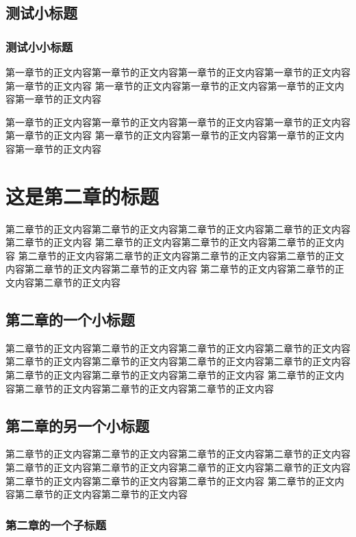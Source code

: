 \documentclass{yacauthesisug}
\begin{document}
\subsection{测试小标题}
\subsubsection{测试小小标题}

第一章节的正文内容第一章节的正文内容第一章节的正文内容第一章节的正文内容第一章节的正文内容
第一章节的正文内容第一章节的正文内容第一章节的正文内容第一章节的正文内容

第一章节的正文内容第一章节的正文内容第一章节的正文内容第一章节的正文内容第一章节的正文内容
第一章节的正文内容第一章节的正文内容第一章节的正文内容第一章节的正文内容

\section{这是第二章的标题}

第二章节的正文内容第二章节的正文内容第二章节的正文内容第二章节的正文内容第二章节的正文内容
第二章节的正文内容第二章节的正文内容第二章节的正文内容
第二章节的正文内容第二章节的正文内容第二章节的正文内容第二章节的正文内容第二章节的正文内容第二章节的正文内容
第二章节的正文内容第二章节的正文内容第二章节的正文内容

\subsection{第二章的一个小标题}

第二章节的正文内容第二章节的正文内容第二章节的正文内容第二章节的正文内容
第二章节的正文内容第二章节的正文内容第二章节的正文内容第二章节的正文内容第二章节的正文内容第二章节的正文内容第二章节的正文内容
第二章节的正文内容第二章节的正文内容第二章节的正文内容第二章节的正文内容

\subsection{第二章的另一个小标题}

第二章节的正文内容第二章节的正文内容第二章节的正文内容\cite{汪昂1881}第二章节的正文内容
第二章节的正文内容第二章节的正文内容第二章节的正文内容第二章节的正文内容第二章节的正文内容第二章节的正文内容第二章节的正文内容
第二章节的正文内容第二章节的正文内容第二章节的正文内容

\subsubsection{第二章的一个子标题}
\end{document}
